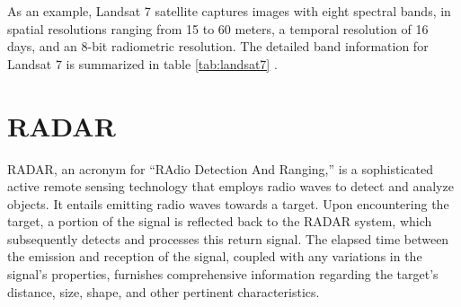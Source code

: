 \documentclass[
  12 pt,
]{Nemilov}
\begin{document}
As an example, Landsat 7 satellite captures images with eight spectral bands, in spatial resolutions ranging from 15 to 60 meters, a temporal resolution of 16 days, and an 8-bit radiometric resolution. The detailed band information for Landsat 7 is summarized in table \ref{tab:landsat7} \citep{NASAl7}.

\begin{table}[!h]
\centering
\caption{\label{tab:landsat7}Band information for Landsat 7}
\centering
{}
\end{table}

\section{RADAR}\label{radar}

RADAR, an acronym for ``RAdio Detection And Ranging,'' is a sophisticated active remote sensing technology that employs radio waves to detect and analyze objects. It entails emitting radio waves towards a target. Upon encountering the target, a portion of the signal is reflected back to the RADAR system, which subsequently detects and processes this return signal. The elapsed time between the emission and reception of the signal, coupled with any variations in the signal's properties, furnishes comprehensive information regarding the target's distance, size, shape, and other pertinent characteristics.
\end{document}
